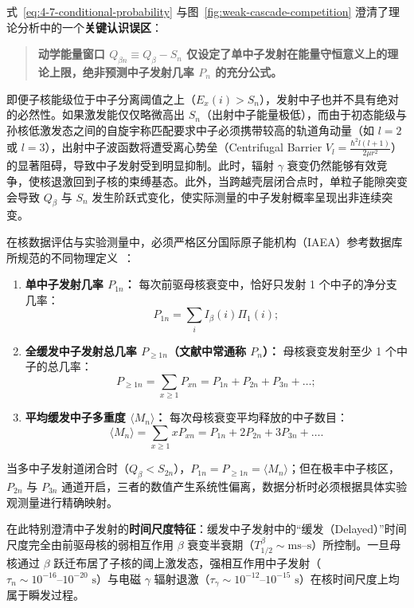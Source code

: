 式~\eqref{eq:4-7-conditional-probability} 与图~\ref{fig:weak-cascade-competition} 澄清了理论分析中的一个\textbf{关键认识误区}：
\begin{quote}
\textbf{动学能量窗口 $Q_{\beta n} \equiv Q_\beta - S_n$ 仅设定了单中子发射在能量守恒意义上的理论上限，绝非预测中子发射几率 $P_n$ 的充分公式。}
\end{quote}
即便子核能级位于中子分离阈值之上（$E_x(i) > S_n$），发射中子也并不具有绝对的必然性。如果激发能仅仅略微高出 $S_n$（出射中子能量极低），而由于初态能级与孙核低激发态之间的自旋宇称匹配要求中子必须携带较高的轨道角动量（如 $l=2$ 或 $l=3$），出射中子波函数将遭受离心势垒（Centrifugal Barrier $V_l = \frac{\hbar^2 l(l+1)}{2\mu r^2}$）的显著阻碍，导致中子发射受到明显抑制。此时，辐射 $\gamma$ 衰变仍然能够有效竞争，使核退激回到子核的束缚基态。此外，当跨越壳层闭合点时，单粒子能隙突变会导致 $Q_\beta$ 与 $S_n$ 发生阶跃式变化，使实际测量的中子发射概率呈现出非连续突变。

在核数据评估与实验测量中，必须严格区分国际原子能机构（IAEA）参考数据库所规范的不同物理定义~\cite{dimitriou-2021-iaea-beta-delayed-neutron-database}：
\begin{enumerate}
\item \textbf{单中子发射几率 $P_{1n}$：} 每次前驱母核衰变中，恰好只发射 1 个中子的净分支几率：
\begin{equation}\label{eq:4-7-P1n-def}
P_{1n} = \sum_{i} I_\beta(i) \Pi_1(i);
\end{equation}
\item \textbf{全缓发中子发射总几率 $P_{\ge 1n}$（文献中常通称 $P_n$）：} 母核衰变发射至少 1 个中子的总几率：
\begin{equation}\label{eq:4-7-P-atleast-1n-def}
P_{\ge 1n} = \sum_{x \ge 1} P_{xn} = P_{1n} + P_{2n} + P_{3n} + \dots;
\end{equation}
\item \textbf{平均缓发中子多重度 $\langle M_n \rangle$：} 每次母核衰变平均释放的中子数目：
\begin{equation}\label{eq:4-7-mean-multiplicity-def}
\langle M_n \rangle = \sum_{x \ge 1} x P_{xn} = P_{1n} + 2 P_{2n} + 3 P_{3n} + \dots.
\end{equation}
\end{enumerate}
当多中子发射道闭合时（$Q_\beta < S_{2n}$），$P_{1n} = P_{\ge 1n} = \langle M_n \rangle$；但在极丰中子核区，$P_{2n}$ 与 $P_{3n}$ 通道开启，三者的数值产生系统性偏离，数据分析时必须根据具体实验观测量进行精确映射。

在此特别澄清中子发射的\textbf{时间尺度特征}：缓发中子发射中的“缓发（Delayed）”时间尺度完全由前驱母核的弱相互作用 $\beta$ 衰变半衰期（$T_{1/2}^\beta \sim \text{ms--s}$）所控制。一旦母核通过 $\beta$ 跃迁布居了子核的阈上激发态，强相互作用中子发射（$\tau_n \sim 10^{-16}\text{--}10^{-20}\text{ s}$）与电磁 $\gamma$ 辐射退激（$\tau_\gamma \sim 10^{-12}\text{--}10^{-15}\text{ s}$）在核时间尺度上均属于瞬发过程。

